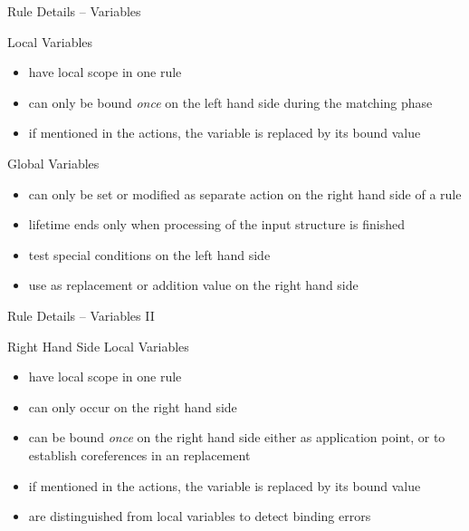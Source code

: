 \documentclass{beamer}
\begin{document}

\begin{frame}{Rule Details -- Variables}
  \begin{block}{Local Variables}
    \begin{itemize}
    \item have local scope in one rule
    \item can only be bound \emph{once} on the left hand side during the
      matching phase
    \item if mentioned in the actions, the variable is replaced by its bound
      value
    \end{itemize}
  \end{block}
  \begin{block}{Global Variables}
    \begin{itemize}
    \item can only be set or modified as separate action on the
      right hand side of a rule
    \item lifetime ends only when processing of the input
      structure is finished
    \item test special conditions on the left hand side
    \item use as replacement or addition value on the right hand side
    \end{itemize}
  \end{block}
\end{frame}


\begin{frame}{Rule Details -- Variables II}
  \begin{block}{Right Hand Side Local Variables}
    \begin{itemize}
    \item have local scope in one rule
    \item can only occur on the right hand side
    \item can be bound \emph{once} on the right hand side either as application
      point, or to establish coreferences in an replacement
    \item if mentioned in the actions, the variable is replaced by its bound
      value
    \item are distinguished from local variables to detect binding errors
    \end{itemize}
  \end{block}
\end{frame}
\end{document}
